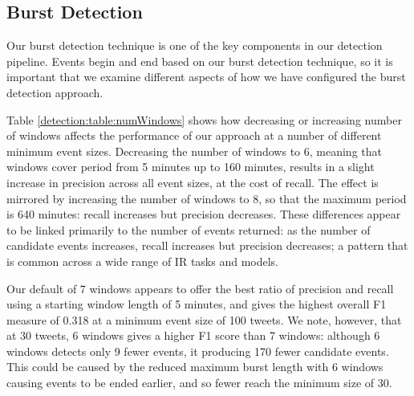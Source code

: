 \subsection{Burst Detection}
\label{detection:sec:burstDetection}

Our burst detection technique is one of the key components in our detection pipeline.
Events begin and end based on our burst detection technique, so it is important that we examine different aspects of how we have configured the burst detection approach.

Table \ref{detection:table:numWindows} shows how decreasing or increasing number of windows affects the performance of our approach at a number of different minimum event sizes.
Decreasing the number of windows to 6, meaning that windows cover period from 5 minutes up to 160 minutes, results in a slight increase in precision across all event sizes, at the cost of recall.
The effect is mirrored by increasing the number of windows to 8, so that the maximum period is 640 minutes: recall increases but precision decreases.
These differences appear to be linked primarily to the number of events returned: as the number of candidate events increases, recall increases but precision decreases; a pattern that is common across a wide range of IR tasks and models.

Our default of 7 windows appears to offer the best ratio of precision and recall using a starting window length of 5 minutes, and gives the highest overall F1 measure of 0.318 at a minimum event size of 100 tweets.
We note, however, that at 30 tweets, 6 windows gives a higher F1 score than 7 windows: although 6 windows detects only 9 fewer events, it producing 170 fewer candidate events.
This could be caused by the reduced maximum burst length with 6 windows causing events to be ended earlier, and so fewer reach the minimum size of 30.


